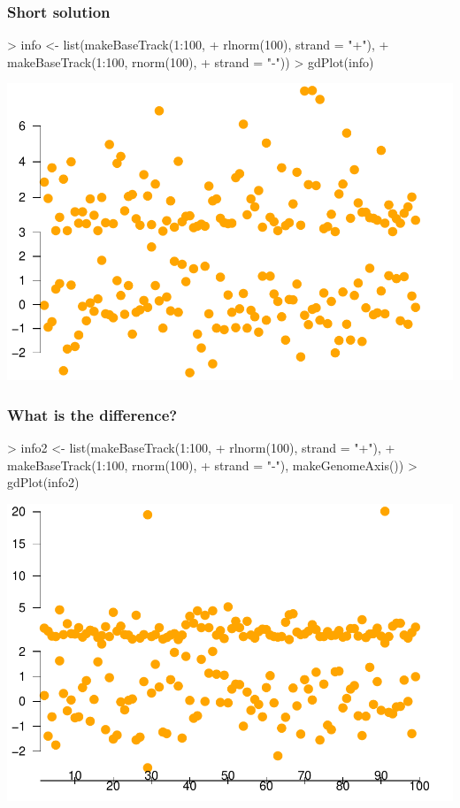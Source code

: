 \begin{frame}
  \frametitle{Short solution}
\begin{Schunk}
\begin{Sinput}
> info <- list(makeBaseTrack(1:100, 
+     rlnorm(100), strand = "+"), 
+     makeBaseTrack(1:100, rnorm(100), 
+         strand = "-"))
> gdPlot(info)
\end{Sinput}
\end{Schunk}
\includegraphics{plots/fig-011}
\end{frame}

\begin{frame}
  \frametitle{What is the difference?}
\begin{Schunk}
\begin{Sinput}
> info2 <- list(makeBaseTrack(1:100, 
+     rlnorm(100), strand = "+"), 
+     makeBaseTrack(1:100, rnorm(100), 
+         strand = "-"), makeGenomeAxis())
> gdPlot(info2)
\end{Sinput}
\end{Schunk}
\includegraphics{plots/fig-012}
\end{frame}


